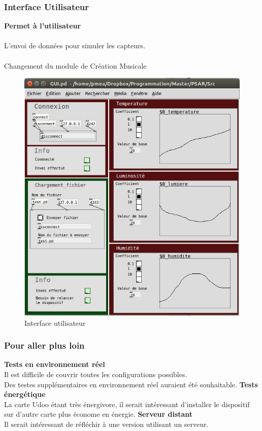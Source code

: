 \documentclass{beamer}
\begin{document}
\begin{frame}
\frametitle{Interface Utilisateur}
\begin{minipage}{0.49\textwidth}
\textbf{Permet à l'utilisateur}\\\\
L'envoi de données pour simuler les capteurs.\\\\
Changement du module de Création Musicale
\end{minipage}
\begin{minipage}{0.49\textwidth}
\begin{figure}
  \centering
  \includegraphics[width=\textwidth]{GUI.jpg} 
	\caption{Interface utilisateur}
\end{figure}
\end{minipage}
\end{frame}


\begin{frame}
\frametitle{Pour aller plus loin}
\textbf{Tests en environnement réel}\\
Il est difficile de couvrir toutes les configurations possibles.\\
Des testes supplémentaires en environnement réel auraient été souhaitable.
\newline
\newline
\textbf{Tests énergétique}\\
La carte Udoo étant très énergivore, il serait intéressant d'installer le dispositif sur d'autre carte plus économe en énergie.
\newline
\newline
\textbf{Serveur distant}\\
Il serait intéressant de réfléchir à une version utilisant un serveur.
\end{frame}
\end{document}
